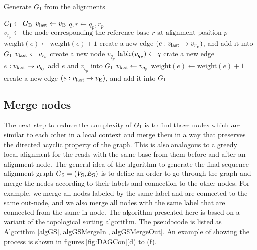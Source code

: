 \documentclass[11pt]{article}
\begin{document}
\begin{algorithm}[H]
\caption{Generate $G_{\rm I}$ from the alignments}          
\label{algGI}
\begin{algorithmic}[1]
\State $G_{\rm I}\gets G_{\rm B}$
\State $v_{\rm last} \gets v_{\rm B}$
	\State $q, r \gets q_p, r_p$
		\State $v_{r_p} \gets \textrm{the node corresponding the reference base } r \textrm{ at alignment position } p $
			\State $\textrm{weight}(e) \gets \textrm{weight}(e) + 1$
		\Else
			\State create a new edge $(e: v_{\rm last} \rightarrow v_{r_p})$, and add it into $G_{\rm I}$
		\EndIf
		\State $v_{\rm last} \gets v_{r_p}$
		\State create a new node $v_{q_p}$
		\State ${\rm lable}(v_{q_p}) \gets q$
		\State crate a new edge $e: v_{\rm last} \rightarrow v_{q_p}$
		\State add $e$ and $v_{q_p}$ into $G_{\rm I}$
		\State $v_{\rm last} \gets v_{q_p}$
	\EndIf
		\State $\textrm{weight}(e) \gets \textrm{weight}(e) + 1$
	\Else
		\State create a new edge $(e: v_{\rm last} \rightarrow v_{\rm E})$, and add it into $G_{\rm I}$
	\EndIf	
\EndFor
\end{algorithmic}
\end{algorithm}  

\subsection{Merge nodes}
The next step to reduce the complexity of $G_{\rm I}$ is to find those nodes which are similar to each other in a local context and merge them in a way that preserves the directed acyclic property of the graph.  This is also analogous to a greedy local alignment for the reads with the same base from them before and after an alignment node. The general idea of the algorithm to generate the final sequence alignment graph $G_{\rm S}=(V_{\rm S}, E_{\rm S})$ is to define an order to go through the graph and merge the nodes according to their labels and connection to the other nodes. For example, we merge all nodes labeled by the same label and are connected to the same out-node, and we also merge all nodes with the same label that are connected from the same in-node.  The algorithm presented here is based on a variant of the topological sorting algorithm. The pseudocode is listed as Algorithm \ref{algGS},\ref{algGSMergeIn},\ref{algGSMergeOut}.  An example of showing the process is shown in figures \ref{fig:DAGCon}(d) to (f).
\end{document}

